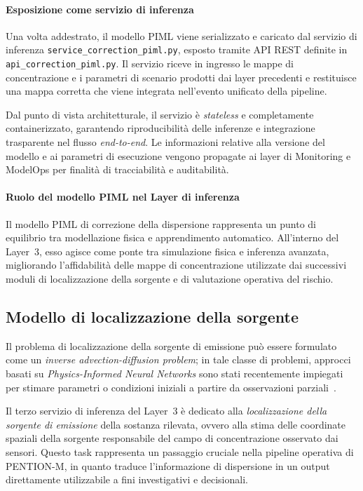 \paragraph{Esposizione come servizio di inferenza}

Una volta addestrato, il modello PIML viene serializzato e caricato dal servizio di inferenza \texttt{service\_correction\_piml.py}, esposto tramite API REST definite in \texttt{api\_correction\_piml.py}.
Il servizio riceve in ingresso le mappe di concentrazione e i parametri di scenario prodotti dai layer precedenti e restituisce una mappa corretta che viene integrata nell’evento unificato della pipeline.

Dal punto di vista architetturale, il servizio è \textit{stateless} e completamente containerizzato, garantendo riproducibilità delle inferenze e integrazione trasparente nel flusso \textit{end-to-end}.
Le informazioni relative alla versione del modello e ai parametri di esecuzione vengono propagate ai layer di Monitoring e ModelOps per finalità di tracciabilità e auditabilità.

\paragraph{Ruolo del modello PIML nel Layer di inferenza}

Il modello PIML di correzione della dispersione rappresenta un punto di equilibrio tra modellazione fisica e apprendimento automatico.
All’interno del Layer~3, esso agisce come ponte tra simulazione fisica e inferenza avanzata, migliorando l’affidabilità delle mappe di concentrazione utilizzate dai successivi moduli di localizzazione della sorgente e di valutazione operativa del rischio.

\subsection{Modello di localizzazione della sorgente}
\label{sec:layer3_source_localization}

Il problema di localizzazione della sorgente di emissione può essere formulato come un \emph{inverse advection-diffusion problem}; in tale classe di problemi, approcci basati su \emph{Physics-Informed Neural Networks} sono stati recentemente impiegati per stimare parametri o condizioni iniziali a partire da osservazioni parziali~\cite{chuprov2025inverse}.

Il terzo servizio di inferenza del Layer~3 è dedicato alla \emph{localizzazione della sorgente di emissione} della sostanza rilevata, ovvero alla stima delle coordinate spaziali della sorgente responsabile del campo di concentrazione osservato dai sensori.
Questo task rappresenta un passaggio cruciale nella pipeline operativa di \textsc{PENTION-M}, in quanto traduce l’informazione di dispersione in un output direttamente utilizzabile a fini investigativi e decisionali.

